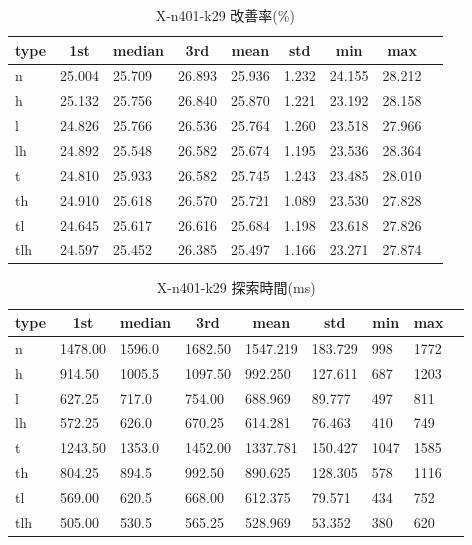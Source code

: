 \begin{table}[htbp]
    \centering
    \caption{X-n401-k29 改善率(\%)}
    \begin{tabular}{|l|l|l|l|l|l|l|l|l|}\hline
    \multicolumn{1}{|c|}{\textbf{type}}
    &\multicolumn{1}{|c|}{\textbf{1st}}
    &\multicolumn{1}{c|}{\textbf{median}}
    &\multicolumn{1}{c|}{\textbf{3rd}}
    &\multicolumn{1}{c|}{\textbf{mean}}
    &\multicolumn{1}{c|}{\textbf{std}}
    &\multicolumn{1}{c|}{\textbf{min}}
    &\multicolumn{1}{c|}{\textbf{max}}\\\hline
	n & 25.004 & 25.709 & 26.893 & 25.936 & 1.232 & 24.155 & 28.212\\\hline
	h & 25.132 & 25.756 & 26.840 & 25.870 & 1.221 & 23.192 & 28.158\\\hline
	l & 24.826 & 25.766 & 26.536 & 25.764 & 1.260 & 23.518 & 27.966\\\hline
	lh & 24.892 & 25.548 & 26.582 & 25.674 & 1.195 & 23.536 & 28.364\\\hline
	t & 24.810 & 25.933 & 26.582 & 25.745 & 1.243 & 23.485 & 28.010\\\hline
	th & 24.910 & 25.618 & 26.570 & 25.721 & 1.089 & 23.530 & 27.828\\\hline
	tl & 24.645 & 25.617 & 26.616 & 25.684 & 1.198 & 23.618 & 27.826\\\hline
	tlh & 24.597 & 25.452 & 26.385 & 25.497 & 1.166 & 23.271 & 27.874\\\hline
	\end{tabular}
\end{table}
\begin{table}[htbp]
    \centering
    \caption{X-n401-k29 探索時間(ms)}
    \begin{tabular}{|l|l|l|l|l|l|l|l|l|}\hline
    \multicolumn{1}{|c|}{\textbf{type}}
    &\multicolumn{1}{|c|}{\textbf{1st}}
    &\multicolumn{1}{c|}{\textbf{median}}
    &\multicolumn{1}{c|}{\textbf{3rd}}
    &\multicolumn{1}{c|}{\textbf{mean}}
    &\multicolumn{1}{c|}{\textbf{std}}
    &\multicolumn{1}{c|}{\textbf{min}}
    &\multicolumn{1}{c|}{\textbf{max}}\\\hline
	n & 1478.00 & 1596.0 & 1682.50 & 1547.219 & 183.729 & 998 & 1772\\\hline
	h & 914.50 & 1005.5 & 1097.50 & 992.250 & 127.611 & 687 & 1203\\\hline
	l & 627.25 & 717.0 & 754.00 & 688.969 & 89.777 & 497 & 811\\\hline
	lh & 572.25 & 626.0 & 670.25 & 614.281 & 76.463 & 410 & 749\\\hline
	t & 1243.50 & 1353.0 & 1452.00 & 1337.781 & 150.427 & 1047 & 1585\\\hline
	th & 804.25 & 894.5 & 992.50 & 890.625 & 128.305 & 578 & 1116\\\hline
	tl & 569.00 & 620.5 & 668.00 & 612.375 & 79.571 & 434 & 752\\\hline
	tlh & 505.00 & 530.5 & 565.25 & 528.969 & 53.352 & 380 & 620\\\hline
	\end{tabular}
\end{table}
